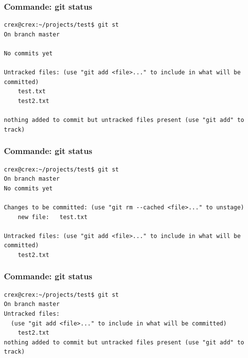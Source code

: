 \documentclass{beamer}
\begin{document}
\begin{frame}[fragile]
\frametitle{Commande: git status}

    \begin{mdframed}[style=Bash]
    \begin{lstlisting}[style=Bash, caption={Tout premier appel à git status}]
crex@crex:~/projects/test$ git st
On branch master

No commits yet

Untracked files: (use "git add <file>..." to include in what will be committed)
	test.txt
	test2.txt

nothing added to commit but untracked files present (use "git add" to track)
    \end{lstlisting}
    \end{mdframed}

\end{frame}


\begin{frame}[fragile]
\frametitle{Commande: git status}

    \begin{mdframed}[style=Bash]
    \begin{lstlisting}[style=Bash, caption={git status après ajout au suivi de test.txt}]
crex@crex:~/projects/test$ git st
On branch master
No commits yet

Changes to be committed: (use "git rm --cached <file>..." to unstage)
	new file:   test.txt

Untracked files: (use "git add <file>..." to include in what will be committed)
	test2.txt
    \end{lstlisting}
    \end{mdframed}

\end{frame}


\begin{frame}[fragile]
\frametitle{Commande: git status}

    \begin{mdframed}[style=Bash]
    \begin{lstlisting}[style=Bash, caption={git status après commit}]
crex@crex:~/projects/test$ git st
On branch master
Untracked files:
  (use "git add <file>..." to include in what will be committed)
	test2.txt
nothing added to commit but untracked files present (use "git add" to track)
    \end{lstlisting}
    \end{mdframed}

\end{frame}
\end{document}
